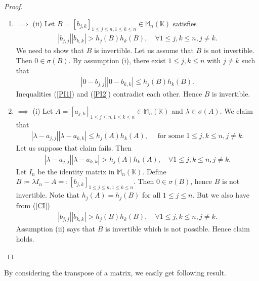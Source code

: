 \documentclass{amsart}
\begin{document}
\begin{proof}
	\begin{enumerate}[\upshape(i)]
		\item $ \implies $ (ii)	Let $B=[b_{j,k}]_{1\leq j\leq n, 1\leq k \leq n}\in  \mathbb{M}_n(\mathbb{K})$ satisfies
		\begin{align}\label{PI1}
			|b_{j,j}||b_{k,k}|>	h_j(B)h_k(B), \quad \forall 1\leq j, k \leq n, j \neq k.
		\end{align}
		We need to show that $B$ is invertible. Let us assume that $B$ is not invertible. Then $0\in \sigma(B)$. By assumption (i), there exist $1\leq j, k \leq n$ with $j \neq k$ such that 
		\begin{align}\label{PI2}
			|0-b_{j, j}||0-b_{k,k}|\leq h_j(B)h_k(B).
		\end{align}
		Inequalities (\ref{PI1}) and (\ref{PI2}) contradict each other. Hence $B$ is invertible. 
		\item $ \implies $ (i) Let $A=[a_{j,k}]_{1\leq j\leq n, 1\leq k \leq n}\in  \mathbb{M}_n(\mathbb{K})$ and $\lambda \in \sigma(A)$. We claim that 
		\begin{align*}
		|\lambda-a_{j, j}||\lambda-a_{k,k}|\leq h_j(A)h_k(A), \quad \text{ for some } 1\leq j, k \leq n, j \neq k.	
		\end{align*}
	Let us suppose that claim fails. Then 
	\begin{align}\label{CI}
		|\lambda-a_{j, j}||\lambda-a_{k,k}|> h_j(A)h_k(A), \quad \forall  1\leq j, k \leq n, j \neq k.
	\end{align}
Let $I_n$ be the identity matrix in $ \mathbb{M}_n(\mathbb{K})$. Define $B\coloneqq \lambda I_n-A=:[b_{j,k}]_{1\leq j\leq n, 1\leq k \leq n}$. Then $0   \in \sigma(B)$, hence $B$ is not invertible. Note that $h_j(A)=h_j(B)$ for all $1\leq j \leq n$. But we also have from (\ref{CI})
\begin{align*}
	|b_{j,j}||b_{k,k}|> h_j(B)h_k(B), \quad \forall  1\leq j, k \leq n, j \neq k.
\end{align*}
Assumption (ii) says that $B$ is invertible which is not possible. Hence claim holds. 
	\end{enumerate}
\end{proof}
By considering the transpose of a matrix, we easily get following result. 
\end{document}
